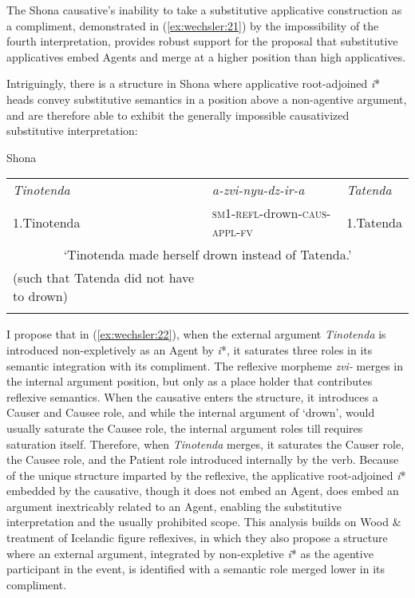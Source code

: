 \documentclass[output=paper]{langscibook}
\begin{document}
The Shona causative’s inability to take a substitutive applicative construction as a compliment, demonstrated in (\ref{ex:wechsler:21}) by the impossibility of the fourth interpretation, provides robust support for the proposal that substitutive applicatives embed Agents and merge at a higher position than high applicatives. 



Intriguingly, there is a structure in Shona where applicative root-adjoined \textit{i}* heads convey substitutive semantics in a position above a non-agentive argument, and are therefore able to exhibit the generally impossible causativized substitutive interpretation:


\ea\label{ex:wechsler:22}
Shona\\

\begin{tabularx}{\textwidth}{XXX}
\lsptoprule
{\itshape Tinotenda}  & \textit{a-zvi-nyu-dz-ir-a} & \textit{Tatenda}\\
1.Tinotenda & \textsc{sm1-refl-}drown\textsc{{}-caus-appl-fv} & 1.Tatenda\\
\multicolumn{3}{c}{‘Tinotenda made herself drown instead of Tatenda.’}\\
(such that Tatenda did not have to drown)\\
\lspbottomrule
\end{tabularx}
\z

I propose that in (\ref{ex:wechsler:22}), when the external argument \textit{Tinotenda} is introduced non-expletively as an Agent by \textit{i}*, it saturates three roles in its semantic integration with its compliment. The reflexive morpheme \textit{zvi-} merges in the internal argument position, but only as a place holder that contributes reflexive semantics. When the causative enters the structure, it introduces a Causer and Causee role, and while the internal argument of ‘drown’, would usually saturate the Causee role, the internal argument roles till requires saturation itself. Therefore, when \textit{Tinotenda} merges, it saturates the Causer role, the Causee role, and the Patient role introduced internally by the verb. Because of the unique structure imparted by the reflexive, the applicative root-adjoined \textit{i}* embedded by the causative, though it does not embed an Agent, does embed an argument inextricably related to an Agent, enabling the substitutive interpretation and the usually prohibited scope. This analysis builds on Wood \&  treatment of Icelandic figure reflexives, in which they also propose a structure where an external argument, integrated by non-expletive \textit{i}* as the agentive participant in the event, is identified with a semantic role merged lower in its compliment. 
\end{document}
